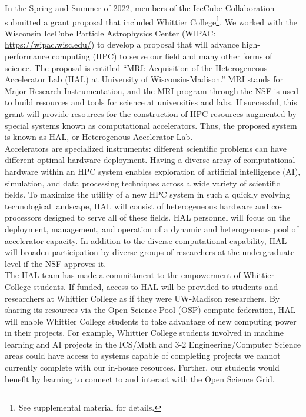 \documentclass[../../../main.tex]{subfiles}
\begin{document}
In the Spring and Summer of 2022, members of the IceCube Collaboration submitted a grant proposal that included Whittier College\footnote{See supplemental material for details.}.  We worked with the Wisconsin IceCube Particle Astrophysics Center (WIPAC: \url{https://wipac.wisc.edu/}) to develop a proposal that will advance high-performance computing (HPC) to serve our field and many other forms of science.  The proposal is entitled ``MRI: Acquisition of the Heterogeneous Accelerator Lab (HAL) at University of Wisconsin-Madison.''  MRI stands for Major Research Instrumentation, and the MRI program through the NSF is used to build resources and tools for science at universities and labs.  If successful, this grant will provide resources for the construction of HPC resources augmented by special systems known as computational accelerators.  Thus, the proposed system is known as HAL, or Heterogenous Accelerator Lab.
\\
\vspace{0.25cm}
Accelerators are specialized instruments: different scientific problems can have different optimal hardware deployment.  Having a diverse array of computational hardware within an HPC system enables exploration of artificial intelligence (AI), simulation, and data processing techniques across a wide variety of scientific fields.  To maximize the utility of a new HPC system in such a quickly evolving technological landscape, HAL will consist of heterogeneous hardware and co-processors designed to serve all of these fields. HAL personnel will focus on the deployment, management, and operation of a dynamic and heterogeneous pool of accelerator capacity.  In addition to the diverse computational capability, HAL will broaden participation by diverse groups of researchers at the undergraduate level if the NSF approves it.
\\
\vspace{0.25cm}
The HAL team has made a committment to the empowerment of Whittier College students.  If funded, access to HAL will be provided to students and researchers at Whittier College as if they were UW-Madison researchers.  By sharing its resources via the
Open Science Pool (OSP) compute federation, HAL will enable Whittier College students to take advantage of new computing power in their projects.  For example, Whittier College students involved in machine learning and AI projects in the ICS/Math and 3-2 Engineering/Computer Science areas could have access to systems capable of completing projects we cannot currently complete with our in-house resources.  Further, our students would benefit by learning to connect to and interact with the Open Science Grid.
\end{document}
